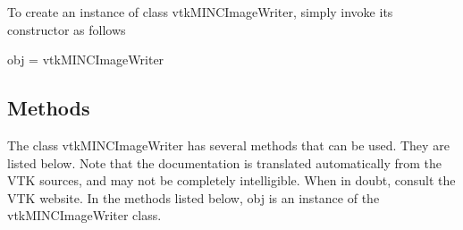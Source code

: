 To create an instance of class vtk\-M\-I\-N\-C\-Image\-Writer, simply invoke its constructor as follows \begin{DoxyVerb}  obj = vtkMINCImageWriter
\end{DoxyVerb}
 \hypertarget{vtkwidgets_vtkxyplotwidget_Methods}{}\subsection{Methods}\label{vtkwidgets_vtkxyplotwidget_Methods}
The class vtk\-M\-I\-N\-C\-Image\-Writer has several methods that can be used. They are listed below. Note that the documentation is translated automatically from the V\-T\-K sources, and may not be completely intelligible. When in doubt, consult the V\-T\-K website. In the methods listed below, {\ttfamily obj} is an instance of the vtk\-M\-I\-N\-C\-Image\-Writer class. 
